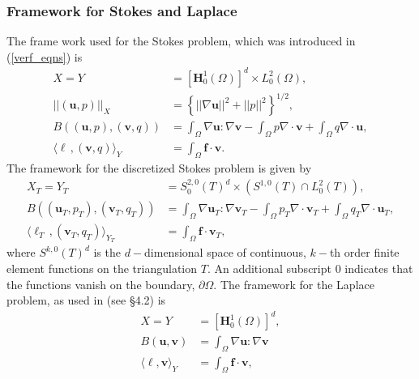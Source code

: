 \documentclass[12pt,a4paper]{article}
\theoremstyle{definition}
\begin{document}
\subsubsection{Framework for Stokes and Laplace}
The frame work used for the Stokes problem, which was introduced in (\ref{verf_eqns}) is 
\begin{equation}\label{frame_stokes}
\begin{aligned}
X=Y&=\left[\textbf{H}^1_0\left(\Omega\right)\right]^d\times L^2_0\left(\Omega\right),\\
\left|\left|\left(\textbf{u},p\right)\right|\right|_X&=\left\lbrace \left|\left|\nabla\textbf{u}\right|\right|^2 + \left|\left|p\right|\right|^2\right\rbrace^{1/2},\\
B\left(\left(\textbf{u},p\right),\left(\textbf{v},q\right)\right)&=\int_{\Omega}\nabla \textbf{u} : \nabla \textbf{v} - \int_{\Omega} p \nabla\cdot\textbf{v} + \int_{\Omega} q \nabla\cdot\textbf{u},\\
\langle \ell\,,\left(\textbf{v},q\right) \rangle_Y &= \int_{\Omega}\textbf{f}\cdot \textbf{v}.
\end{aligned}
\end{equation}
The framework for the discretized Stokes problem is given by 
\begin{equation}\label{frame_stokes_disc}
\begin{aligned}
X_T=Y_T&=S_0^{2,0}\left(T\right)^d\times \left(S^{1,0}\left(T\right)\cap L^2_0\left(T\right)\right),\\
B\left(\left(\textbf{u}_T,p_T\right),\left(\textbf{v}_T,q_T\right)\right)&=\int_{\Omega}\nabla \textbf{u}_T : \nabla \textbf{v}_T - \int_{\Omega} p_T \nabla\cdot\textbf{v}_T + \int_{\Omega} q_T \nabla\cdot\textbf{u}_T,\\
\langle \ell_T\,,\left(\textbf{v}_T,q_T\right) \rangle_{Y_T} &= \int_{\Omega}\textbf{f}\cdot \textbf{v}_T,
\end{aligned}
\end{equation}
where $S^{k,0}\left(T\right)^d$ is the $d-$dimensional space of continuous, $k-$th order finite element functions on the triangulation $T$.  An additional subscript $0$ indicates that the functions vanish on the boundary, $\partial \Omega$.
The framework for the Laplace problem, as used in \cite{verfurth2013posteriori} (see \S 4.2) is 
\begin{equation}\label{frame_laplace}
\begin{aligned}
X=Y&=\left[\textbf{H}^1_0\left(\Omega\right)\right]^d,\\
B\left(\textbf{u},\textbf{v}\right)&=\int_{\Omega}\nabla \textbf{u} : \nabla \textbf{v}\\
\langle \ell,\textbf{v} \rangle_Y &= \int_{\Omega}\textbf{f}\cdot \textbf{v}, 
\end{aligned}
\end{equation}
\end{document}
